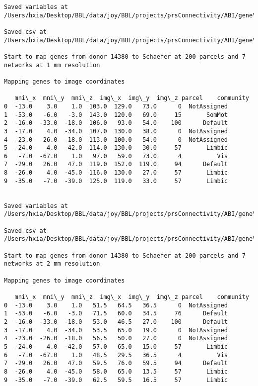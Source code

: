 \documentclass[11pt]{article}
\begin{document}
\begin{Verbatim}[commandchars=\\\{\}]
Saved variables at /Users/hxia/Desktop/BBL/data/joy/BBL/projects/prsConnectivity/ABI/gene\_mapping/14380donor\_100Parcels\_17Network\_2mm.pkl

Saved csv at /Users/hxia/Desktop/BBL/data/joy/BBL/projects/prsConnectivity/ABI/gene\_mapping/14380donor\_100Parcels\_17Network\_2mm.csv

Start to map genes from donor 14380 to Schaefer at 200 parcels and 7 networks at 1 mm resolution

Mapping genes to image coordinates

   mni\_x  mni\_y  mni\_z  img\_x  img\_y  img\_z parcel    community
0  -13.0    3.0    1.0  103.0  129.0   73.0      0  NotAssigned
1  -53.0   -6.0   -3.0  143.0  120.0   69.0     15       SomMot
2  -16.0  -33.0  -18.0  106.0   93.0   54.0    100      Default
3  -17.0    4.0  -34.0  107.0  130.0   38.0      0  NotAssigned
4  -23.0  -26.0  -18.0  113.0  100.0   54.0      0  NotAssigned
5  -24.0    4.0  -42.0  114.0  130.0   30.0     57       Limbic
6   -7.0  -67.0    1.0   97.0   59.0   73.0      4          Vis
7  -29.0   26.0   47.0  119.0  152.0  119.0     94      Default
8  -26.0    4.0  -45.0  116.0  130.0   27.0     57       Limbic
9  -35.0   -7.0  -39.0  125.0  119.0   33.0     57       Limbic


Saved variables at /Users/hxia/Desktop/BBL/data/joy/BBL/projects/prsConnectivity/ABI/gene\_mapping/14380donor\_200Parcels\_7Network\_1mm.pkl

Saved csv at /Users/hxia/Desktop/BBL/data/joy/BBL/projects/prsConnectivity/ABI/gene\_mapping/14380donor\_200Parcels\_7Network\_1mm.csv

Start to map genes from donor 14380 to Schaefer at 200 parcels and 7 networks at 2 mm resolution

Mapping genes to image coordinates

   mni\_x  mni\_y  mni\_z  img\_x  img\_y  img\_z parcel    community
0  -13.0    3.0    1.0   51.5   64.5   36.5      0  NotAssigned
1  -53.0   -6.0   -3.0   71.5   60.0   34.5     76      Default
2  -16.0  -33.0  -18.0   53.0   46.5   27.0    100      Default
3  -17.0    4.0  -34.0   53.5   65.0   19.0      0  NotAssigned
4  -23.0  -26.0  -18.0   56.5   50.0   27.0      0  NotAssigned
5  -24.0    4.0  -42.0   57.0   65.0   15.0     57       Limbic
6   -7.0  -67.0    1.0   48.5   29.5   36.5      4          Vis
7  -29.0   26.0   47.0   59.5   76.0   59.5     94      Default
8  -26.0    4.0  -45.0   58.0   65.0   13.5     57       Limbic
9  -35.0   -7.0  -39.0   62.5   59.5   16.5     57       Limbic



\end{Verbatim}
\end{document}
